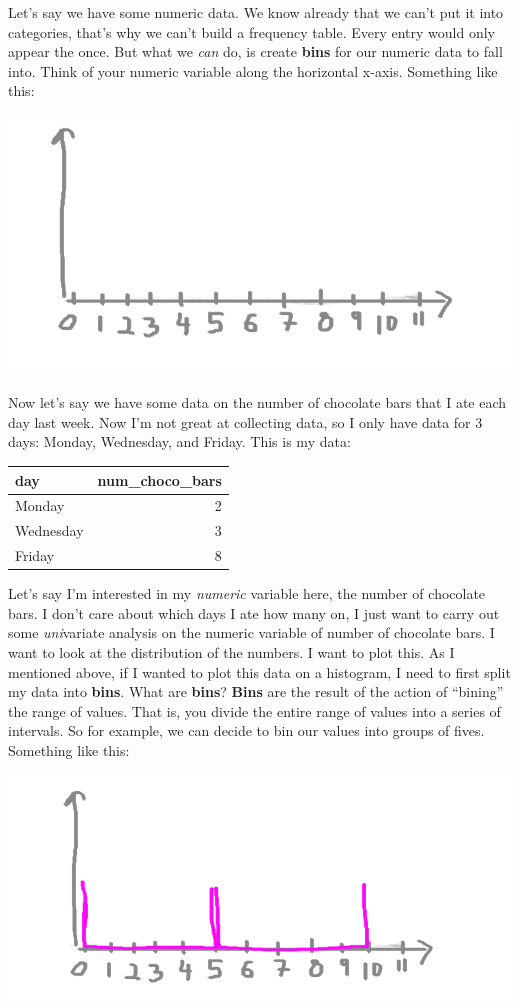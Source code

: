 \documentclass[]{book}
\theoremstyle{definition}
\theoremstyle{definition}
\theoremstyle{definition}
\theoremstyle{remark}
\begin{document}
Let's say we have some numeric data. We know already that we can't put
it into categories, that's why we can't build a frequency table. Every
entry would only appear the once. But what we \emph{can} do, is create
\textbf{bins} for our numeric data to fall into. Think of your numeric
variable along the horizontal x-axis. Something like this:

\includegraphics{imgs/hist_blank_x.png}

Now let's say we have some data on the number of chocolate bars that I
ate each day last week. Now I'm not great at collecting data, so I only
have data for 3 days: Monday, Wednesday, and Friday. This is my data:

\begin{tabular}{l|r}
\hline
day & num\_choco\_bars\\
\hline
Monday & 2\\
\hline
Wednesday & 3\\
\hline
Friday & 8\\
\hline
\end{tabular}

Let's say I'm interested in my \emph{numeric} variable here, the number
of chocolate bars. I don't care about which days I ate how many on, I
just want to carry out some \emph{uni}variate analysis on the numeric
variable of number of chocolate bars. I want to look at the distribution
of the numbers. I want to plot this. As I mentioned above, if I wanted
to plot this data on a histogram, I need to first split my data into
\textbf{bins}. What are \textbf{bins}? \textbf{Bins} are the result of
the action of ``bining'' the range of values. That is, you divide the
entire range of values into a series of intervals. So for example, we
can decide to bin our values into groups of fives. Something like this:

\includegraphics{imgs/hist_bins.png}
\end{document}
